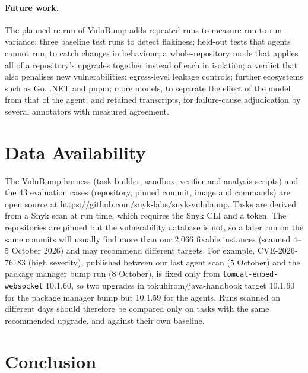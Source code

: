 \documentclass[11pt]{article}
\theoremstyle{definition}
\newcommand{\bench}{VulnBump}
\newcommand{\pmbump}{package manager bump}
\begin{document}
\paragraph{Future work.}\label{sec:future} The planned re-run of \bench{} adds repeated runs to measure run-to-run variance; three baseline test runs to detect flakiness; held-out tests that agents cannot run, to catch changes in behaviour; a whole-repository mode that applies all of a repository's upgrades together instead of each in isolation; a verdict that also penalises new vulnerabilities; egress-level leakage controls; further ecosystems such as Go, .NET and pnpm; more models, to separate the effect of the model from that of the agent; and retained transcripts, for failure-cause adjudication by several annotators with measured agreement.

\section{Data Availability}
\label{sec:data}

The \bench{} harness (task builder, sandbox, verifier and analysis scripts) and the 43 evaluation cases (repository, pinned commit, image and commands) are open source at \url{https://github.com/snyk-labs/snyk-vulnbump}. Tasks are derived from a Snyk scan at run time, which requires the Snyk CLI and a token. The repositories are pinned but the vulnerability database is not, so a later run on the same commits will usually find more than our 2{,}066 fixable instances (scanned 4--5 October 2026) and may recommend different targets. For example, CVE-2026-76183 (high severity), published between our last agent scan (5 October) and the \pmbump{} run (8 October), is fixed only from \texttt{tomcat-embed-websocket} 10.1.60, so two upgrades in tokuhirom/java-handbook target 10.1.60 for the \pmbump{} but 10.1.59 for the agents. Runs scanned on different days should therefore be compared only on tasks with the same recommended upgrade, and against their own baseline.

\section{Conclusion}
\end{document}
